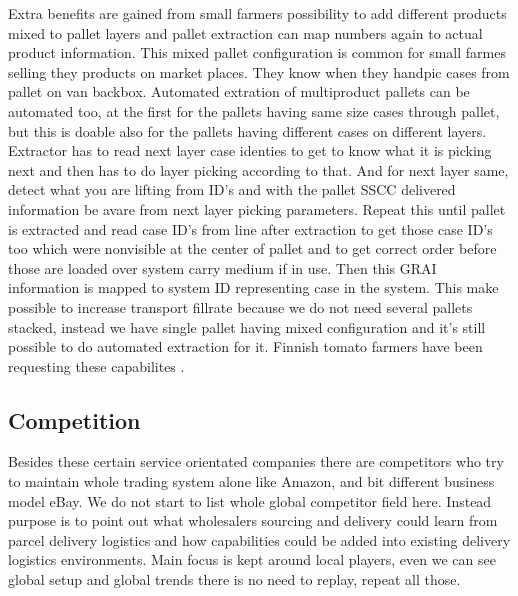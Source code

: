 Extra benefits are gained from small farmers possibility to add different
products mixed to pallet layers and pallet extraction can map numbers again
to actual product information. This mixed pallet configuration is common for
small farmes selling they products on market places. They know when they
handpic cases from pallet on van backbox. Automated extration of multiproduct
pallets can be automated too, at the first for the pallets having same size
cases through pallet, but this is doable also for the pallets having different
cases on different layers. Extractor has to read next layer case identies to
get to know what it is picking next and then has to do layer picking according
to that. And for next layer same, detect what you are lifting from ID's and
with the pallet SSCC delivered information be avare from next layer picking
parameters. Repeat this until pallet is extracted and read case ID's from line
after extraction to get those case ID's too which were nonvisible at the center
of pallet and to get correct order before those are loaded over system carry
medium if in use. Then this GRAI information is mapped to system ID
representing case in the system. This make possible to increase transport
fillrate because we do not need several pallets stacked, instead we have single
pallet having mixed configuration and it's still possible to do automated
extraction for it. Finnish tomato farmers have been requesting these
capabilites \cite{WaterBalls}.

\subsection{Competition}
\label{competition}
Besides these certain service orientated companies there are competitors who
try to maintain whole trading system alone like Amazon\cite{Amazon}, and bit
different business model eBay\cite{eBay}. We do not start to list whole global
competitor field here. Instead purpose is to point out what wholesalers
sourcing and delivery could learn from parcel delivery logistics and how
capabilities could be added into existing delivery logistics environments.
Main focus is kept around local players, even we can see global setup and global
trends there is no need to replay, repeat all those.

